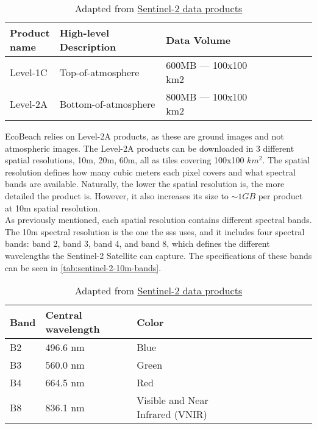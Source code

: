 \begin{table}[h!]
    \centering
    \begin{tabular}{| p{0.15\linewidth} | p{0.35\linewidth} | p{0.35\linewidth} |p{0.15\linewidth} |}
        \hline
        \textbf{Product name} & \textbf{High-level Description} & \textbf{Data Volume} \\ \hline
        Level-1C              & Top-of-atmosphere               & 600MB — 100x100 km2  \\\hline
        Level-2A              & Bottom-of-atmosphere            & 800MB — 100x100 km2  \\\hline
    \end{tabular}
    \caption{Adapted from \href{https://sentinels.copernicus.eu/web/sentinel/missions/sentinel-2/data-products}{Sentinel-2 data products}}
    \label{tab:sentinel-2-product-types}
\end{table}

EcoBeach relies on Level-2A products, as these are ground images and not atmospheric images. The Level-2A products can be downloaded in 3 different spatial resolutions, 10m, 20m, 60m, all as tiles covering 100x100 $km^2$. The spatial resolution defines how many cubic meters each pixel covers and what spectral bands are available. Naturally, the lower the spatial resolution is, the more detailed the product is. However, it also increases its size to $\sim 1GB$ per product at 10m spatial resolution. \\

As previously mentioned, each spatial resolution contains different spectral bands. The 10m spectral resolution is the one the \acrshort{sss} uses, and it includes four spectral bands: band 2, band 3, band 4, and band 8, which defines the different wavelengths the Sentinel-2 Satellite can capture. The specifications of these bands can be seen in \autoref{tab:sentinel-2-10m-bands}.
\cite{sentinel-2-product-specification}

\begin{table}[h!]
    \centering
    \begin{tabular}{| p{0.1\linewidth} | p{0.3\linewidth} | p{0.3\linewidth} | p{0.3\linewidth} |}
        \hline
        \textbf{Band} & \textbf{Central wavelength} & \textbf{Color}                   \\ \hline
        B2            & 496.6 nm                    & Blue                             \\ \hline
        B3            & 560.0 nm                    & Green                            \\ \hline
        B4            & 664.5 nm                    & Red                              \\ \hline
        B8            & 836.1 nm                    & Visible and Near Infrared (VNIR) \\ \hline
    \end{tabular}
    \caption{Adapted from \href{https://sentinels.copernicus.eu/web/sentinel/missions/sentinel-2/data-products}{Sentinel-2 data products}}
    \label{tab:sentinel-2-10m-bands}
\end{table}

